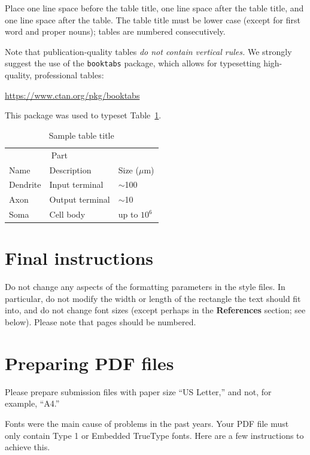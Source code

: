 \documentclass{article}
\begin{document}
Place one line space before the table title, one line space after the
table title, and one line space after the table. The table title must
be lower case (except for first word and proper nouns); tables are
numbered consecutively.

Note that publication-quality tables \emph{do not contain vertical rules.} We
strongly suggest the use of the \verb+booktabs+ package, which allows for
typesetting high-quality, professional tables:
\begin{center}
  \url{https://www.ctan.org/pkg/booktabs}
\end{center}
This package was used to typeset Table~\ref{sample-table}.

\begin{table}
  \caption{Sample table title}
  \label{sample-table}
  \centering
  \begin{tabular}{lll}
    \toprule
    \multicolumn{2}{c}{Part}                   \\
    \cmidrule(r){1-2}
    Name     & Description     & Size ($\mu$m) \\
    \midrule
    Dendrite & Input terminal  & $\sim$100     \\
    Axon     & Output terminal & $\sim$10      \\
    Soma     & Cell body       & up to $10^6$  \\
    \bottomrule
  \end{tabular}
\end{table}

\section{Final instructions}

Do not change any aspects of the formatting parameters in the style files.  In
particular, do not modify the width or length of the rectangle the text should
fit into, and do not change font sizes (except perhaps in the
\textbf{References} section; see below). Please note that pages should be
numbered.

\section{Preparing PDF files}

Please prepare submission files with paper size ``US Letter,'' and not, for
example, ``A4.''

Fonts were the main cause of problems in the past years. Your PDF file must only
contain Type 1 or Embedded TrueType fonts. Here are a few instructions to
achieve this.
\end{document}
